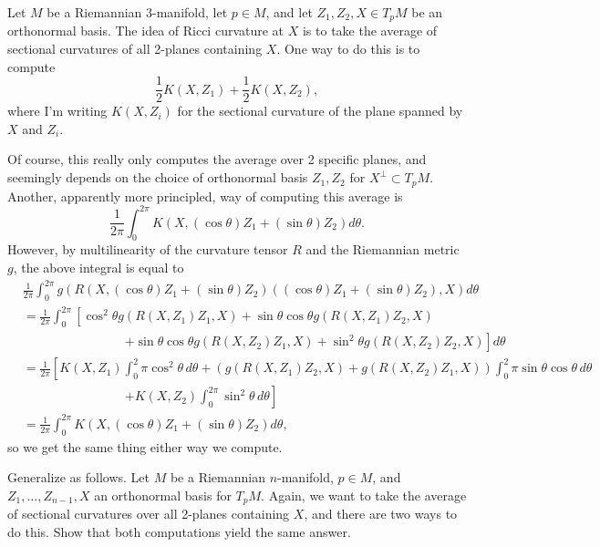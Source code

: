 \begin{example}\label{ex:averaging sectional curvatures}
	Let $M$ be a Riemannian 3-manifold, let $p \in M$, and let $Z_1,Z_2,X \in T_pM$ be an orthonormal basis. The idea of Ricci curvature at $X$ is to take the average of sectional curvatures of all 2-planes containing $X$. One way to do this is to compute
	\[
		\frac{1}{2} K(X,Z_1) + \frac{1}{2} K(X,Z_2),
	\]
	where I'm writing $K(X,Z_i)$ for the sectional curvature of the plane spanned by $X$ and $Z_i$. 
	
	Of course, this really only computes the average over 2 specific planes, and seemingly depends on the choice of orthonormal basis $Z_1,Z_2$ for $X^\bot \subset T_pM$. Another, apparently more principled, way of computing this average is
	\[
		\frac{1}{2\pi} \int_0^{2\pi} K(X, (\cos \theta) Z_1 + (\sin \theta)Z_2)d\theta.
	\]
	However, by multilinearity of the curvature tensor $R$ and the Riemannian metric $g$, the above integral is equal to
	\begin{align*}
		& \frac{1}{2\pi} \int_0^{2\pi} g(R(X, (\cos \theta) Z_1 + (\sin \theta)Z_2)((\cos \theta) Z_1 + (\sin \theta)Z_2),X) d\theta \\
		 & = \frac{1}{2\pi} \int_0^{2\pi} \left[ \cos^2 \theta g(R(X,Z_1)Z_1,X) + \sin\theta\cos\theta g(R(X,Z_1)Z_2,X) \right.\\
		& \qquad \qquad \qquad \qquad \left. + \sin\theta\cos\theta g(R(X,Z_2)Z_1,X) + \sin^2\theta g(R(X,Z_2)Z_2,X)\right]d\theta \\
		& = \frac{1}{2\pi} \left[ K(X,Z_1) \int_0^2\pi \cos^2 \theta\, d\theta  + (g(R(X,Z_1)Z_2,X) + g(R(X,Z_2)Z_1,X)) \int_0^2\pi \sin \theta \cos \theta\, d\theta \right. \\
		& \qquad \qquad \qquad \qquad \left. + K(X,Z_2)\int_0^{2\pi} \sin^2\theta \, d\theta\right] \\
		& = \frac{1}{2\pi} \int_0^{2\pi} K(X, (\cos \theta) Z_1 + (\sin \theta)Z_2)d\theta,
	\end{align*}
	so we get the same thing either way we compute.
\end{example}

\begin{exercise}\label{ex:averaging sectional curvatures 2}
	Generalize  as follows. Let $M$ be a Riemannian $n$-manifold, $p\in M$, and $ Z_1, \dots , Z_{n-1}, X$ an orthonormal basis for $T_pM$. Again, we want to take the average of sectional curvatures over all 2-planes containing $X$, and there are two ways to do this. Show that both computations yield the same answer.
\end{exercise}

